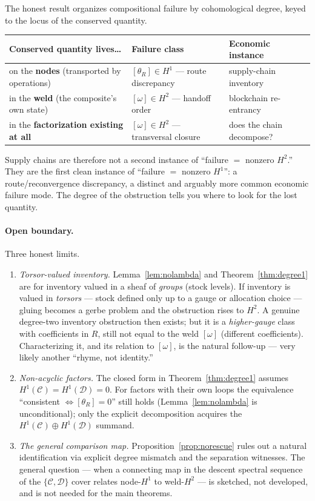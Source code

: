\documentclass[11pt]{article}
\theoremstyle{definition}
\newcommand{\C}{\mathcal{C}}
\newcommand{\D}{\mathcal{D}}
\begin{document}
The honest result organizes compositional failure by cohomological degree, keyed to the locus of
the conserved quantity.

\begin{center}
\begin{tabular}{@{}lll@{}}
\toprule
Conserved quantity lives\ldots & Failure class & Economic instance \\
\midrule
on the \textbf{nodes} (transported by operations) & $[\theta_R]\in H^1$ --- route discrepancy & supply-chain inventory \\
in the \textbf{weld} (the composite's own state) & $[\omega]\in H^2$ --- handoff order & blockchain re-entrancy \\
in the \textbf{factorization existing at all} & $[\omega]\in H^2$ --- transversal closure & does the chain decompose? \\
\bottomrule
\end{tabular}
\end{center}

\noindent Supply chains are therefore not a second instance of ``failure $=$ nonzero $H^2$.''
They are the first clean instance of ``failure $=$ nonzero $H^1$'': a route/reconvergence
discrepancy, a distinct and arguably more common economic failure mode. The degree of the
obstruction tells you where to look for the lost quantity.

\paragraph{Open boundary.} Three honest limits.
\begin{enumerate}
\item \emph{Torsor-valued inventory.} Lemma~\ref{lem:nolambda} and Theorem~\ref{thm:degree1} are
for inventory valued in a sheaf of \emph{groups} (stock levels). If inventory is valued in
\emph{torsors} --- stock defined only up to a gauge or allocation choice --- gluing becomes a
gerbe problem and the obstruction rises to $H^2$. A genuine degree-two inventory obstruction
then exists; but it is a \emph{higher-gauge} class with coefficients in $R$, still not equal to
the weld $[\omega]$ (different coefficients). Characterizing it, and its relation to $[\omega]$,
is the natural follow-up --- very likely another ``rhyme, not identity.''
\item \emph{Non-acyclic factors.} The closed form in Theorem~\ref{thm:degree1} assumes
$H^1(\C)=H^1(\D)=0$. For factors with their own loops the equivalence
``consistent $\iff[\theta_R]=0$'' still holds (Lemma~\ref{lem:nolambda} is unconditional); only
the explicit decomposition acquires the $H^1(\C)\oplus H^1(\D)$ summand.
\item \emph{The general comparison map.} Proposition~\ref{prop:norescue} rules out a natural
identification via explicit degree mismatch and the separation witnesses. The general question
--- when a connecting map in the descent spectral sequence of the $\{\C,\D\}$ cover relates
node-$H^1$ to weld-$H^2$ --- is sketched, not developed, and is not needed for the main theorems.
\end{enumerate}
\end{document}
